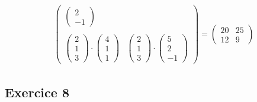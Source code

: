 \documentclass[12pt]{article}
\begin{document}
\begin{enumerate}
\begin{enumerate}
\begin{align*}
\begin{pmatrix}
\begin{pmatrix}
                    2 \\
                    -1
                \end{pmatrix} \\ \\
                \begin{pmatrix}
                    2 \\
                    1 \\
                    3
                \end{pmatrix} \cdot
                \begin{pmatrix}
                    4 \\
                    1 \\
                    1
                \end{pmatrix} &
                \begin{pmatrix}
                    2 \\
                    1 \\
                    3
                \end{pmatrix} \cdot
                \begin{pmatrix}
                    5 \\
                    2 \\
                    -1
                \end{pmatrix}
            \end{pmatrix}
            = \begin{pmatrix}
                20 & 25 \\
                12 & 9
            \end{pmatrix}
        \end{align*}
    \end{enumerate}
\end{enumerate}

\subsection*{Exercice 8}
\end{document}
